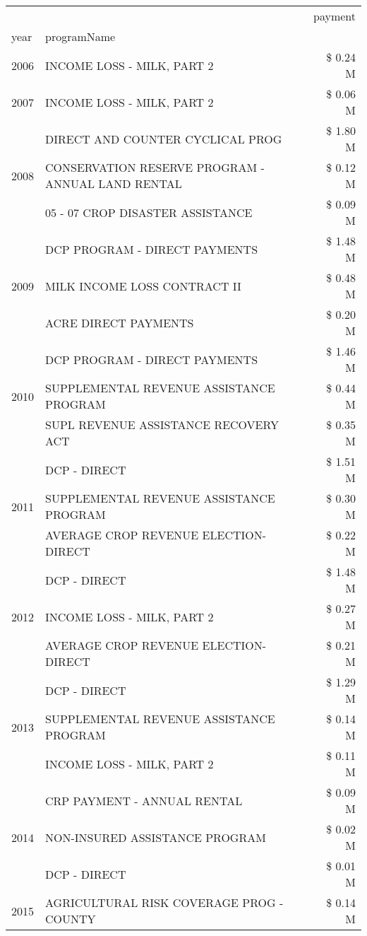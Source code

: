 \begin{tabular}{llr}
\toprule
 &  & payment \\
year & programName &  \\
\midrule
2006 & INCOME LOSS - MILK, PART 2 & \$ 0.24 M \\
\cline{1-3}
2007 & INCOME LOSS - MILK, PART 2 & \$ 0.06 M \\
\cline{1-3}
\multirow[t]{3}{*}{2008} & DIRECT AND COUNTER CYCLICAL PROG & \$ 1.80 M \\
 & CONSERVATION RESERVE PROGRAM - ANNUAL LAND RENTAL & \$ 0.12 M \\
 & 05 - 07 CROP DISASTER ASSISTANCE & \$ 0.09 M \\
\cline{1-3}
\multirow[t]{3}{*}{2009} & DCP PROGRAM - DIRECT PAYMENTS & \$ 1.48 M \\
 & MILK INCOME LOSS CONTRACT II & \$ 0.48 M \\
 & ACRE DIRECT PAYMENTS & \$ 0.20 M \\
\cline{1-3}
\multirow[t]{3}{*}{2010} & DCP PROGRAM - DIRECT PAYMENTS & \$ 1.46 M \\
 & SUPPLEMENTAL REVENUE ASSISTANCE PROGRAM & \$ 0.44 M \\
 & SUPL REVENUE ASSISTANCE RECOVERY ACT & \$ 0.35 M \\
\cline{1-3}
\multirow[t]{3}{*}{2011} & DCP - DIRECT & \$ 1.51 M \\
 & SUPPLEMENTAL REVENUE ASSISTANCE PROGRAM & \$ 0.30 M \\
 & AVERAGE CROP REVENUE ELECTION-DIRECT & \$ 0.22 M \\
\cline{1-3}
\multirow[t]{3}{*}{2012} & DCP - DIRECT & \$ 1.48 M \\
 & INCOME LOSS - MILK, PART 2 & \$ 0.27 M \\
 & AVERAGE CROP REVENUE ELECTION-DIRECT & \$ 0.21 M \\
\cline{1-3}
\multirow[t]{3}{*}{2013} & DCP - DIRECT & \$ 1.29 M \\
 & SUPPLEMENTAL REVENUE ASSISTANCE PROGRAM & \$ 0.14 M \\
 & INCOME LOSS - MILK, PART 2 & \$ 0.11 M \\
\cline{1-3}
\multirow[t]{3}{*}{2014} & CRP PAYMENT - ANNUAL RENTAL & \$ 0.09 M \\
 & NON-INSURED ASSISTANCE PROGRAM & \$ 0.02 M \\
 & DCP - DIRECT & \$ 0.01 M \\
\cline{1-3}
\multirow[t]{3}{*}{2015} & AGRICULTURAL RISK COVERAGE PROG - COUNTY & \$ 0.14 M \\

\end{tabular}
